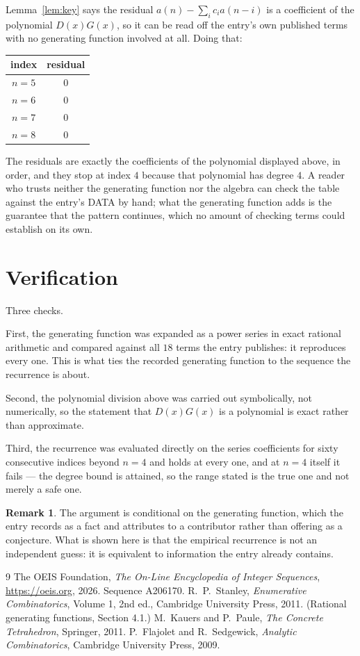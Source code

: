 \documentclass[11pt,a4paper]{article}
\theoremstyle{plain}
\theoremstyle{definition}
\newtheorem{remark}[theorem]{Remark}
\begin{document}
Lemma~\ref{lem:key} says the residual $a(n)-\sum_ic_ia(n-i)$ is a coefficient of the
polynomial $D(x)G(x)$, so it can be read off the entry's own published terms with no
generating function involved at all. Doing that:
\begin{center}
\begin{tabular}{cc}
index & residual \\ \hline
$n=5$ & $0$ \\
$n=6$ & $0$ \\
$n=7$ & $0$ \\
$n=8$ & $0$
\end{tabular}
\end{center}
The residuals are exactly the coefficients of the polynomial displayed above, in order, and
they stop at index $4$ because that polynomial has degree $4$. A reader who trusts
neither the generating function nor the algebra can check the table against the entry's DATA
by hand; what the generating function adds is the guarantee that the pattern continues, which
no amount of checking terms could establish on its own.

\section{Verification}

Three checks.

First, the generating function was expanded as a power series in exact rational arithmetic and
compared against all $18$ terms the entry publishes: it reproduces every one. This is
what ties the recorded generating function to the sequence the recurrence is about.

Second, the polynomial division above was carried out symbolically, not numerically, so the
statement that $D(x)G(x)$ is a polynomial is exact rather than approximate.

Third, the recurrence was evaluated directly on the series coefficients for sixty consecutive
indices beyond $n=4$ and holds at every one, and at $n=4$ itself it fails --- the
degree bound is attained, so the range stated is the true one and not merely a safe one.

\begin{remark}
The argument is conditional on the generating function, which the entry records as a fact and
attributes to a contributor rather than offering as a conjecture. What is shown here is that
the empirical recurrence is not an independent guess: it is equivalent to information the
entry already contains.
\end{remark}

\begin{thebibliography}{9}
 The OEIS Foundation, \emph{The On-Line Encyclopedia of Integer
Sequences}, \url{https://oeis.org}, 2026. Sequence A206170.
 R.~P.~Stanley, \emph{Enumerative Combinatorics}, Volume 1, 2nd ed.,
Cambridge University Press, 2011. (Rational generating functions, Section 4.1.)
 M.~Kauers and P.~Paule, \emph{The Concrete Tetrahedron}, Springer, 2011.
 P.~Flajolet and R.~Sedgewick, \emph{Analytic Combinatorics}, Cambridge
University Press, 2009.
\end{thebibliography}
\end{document}
